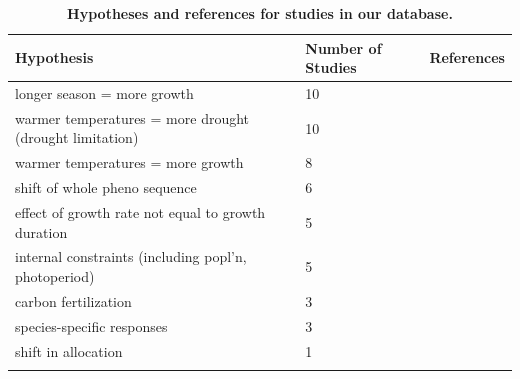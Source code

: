 \documentclass[11pt]{article}
\begin{document}
\begingroup\footnotesize
\begin{longtable}{p{}p{}p{}}
\caption{\textbf{Hypotheses and references for studies in our database.}} \\ 
  \hline
Hypothesis & Number of Studies & References \\ 
  \hline \endhead  \hline
longer season = more growth &  10 & \citep{camarero2022decoupled,chen2000,vcufar2015variations,delpierre2017tree,de2022temperature,gao2022earlier,grossiord2022warming,keenan2014net,silvestro2023longer,wheeler2016snow} \\ 
  warmer temperatures = more drought (drought limitation) &  10 & \citep{brand2022,buermann2018widespread,camarero2022decoupled,de2022temperature,drew2018growth,eckes2021,etzold2022number,kolavr2016response,oddi2022contrasting,zhu2021different} \\ 
  warmer temperatures = more growth &   8 & \citep{camarero2022decoupled,dow2022warm,finzi2020,moser2010timing,richardson2010influence,soolanayakanahally2013timing,stridbeck2022,zhang2021drought} \\ 
  shift of whole pheno sequence &   6 & \citep{delpierre2017tree,de2022temperature,richardson2010influence,soolanayakanahally2013timing,zani2020increased,zohner2020interactive} \\ 
  effect of growth rate not equal to growth duration &   5 & \citep{cuny2012life,de2022temperature,francon2020,michelot2012comparing,ren2019} \\ 
  internal constraints (including popl'n, photoperiod) &   5 & \citep{moser2010timing,sebazc2020,soolanayakanahally2013timing,vitasse2009altitudinal,zohner2023effect} \\ 
  carbon fertilization &   3 & \citep{chen1999effects,finzi2020,oddi2022contrasting} \\ 
  species-specific responses &   3 & \citep{cuny2012life,etzold2022number,michelot2012comparing} \\ 
  shift in allocation &   1 & \citep{mckown2016impacts} \\ 
  \hline
\label{tab:ref}
\end{longtable}
\endgroup
\end{document}
